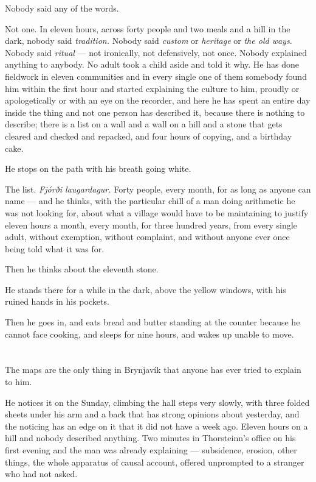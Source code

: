 \documentclass[11pt,oneside]{book}
\begin{document}
Nobody said any of the words.

Not one. In eleven hours, across forty people and two meals and a hill
in the dark, nobody said \emph{tradition.} Nobody said \emph{custom} or
\emph{heritage} or \emph{the old ways.} Nobody said \emph{ritual} ---
not ironically, not defensively, not once. Nobody explained anything to
anybody. No adult took a child aside and told it why. He has done
fieldwork in eleven communities and in every single one of them somebody
found him within the first hour and started explaining the culture to
him, proudly or apologetically or with an eye on the recorder, and here
he has spent an entire day inside the thing and not one person has
described it, because there is nothing to describe; there is a list on
a wall and a wall on a hill and a stone that gets cleared and checked
and repacked, and four hours of copying, and a birthday cake.

He stops on the path with his breath going white.

The list. \emph{Fjórði laugardagur.} Forty people, every month, for as
long as anyone can name --- and he thinks, with the particular chill of
a man doing arithmetic he was not looking for, about what a village
would have to be maintaining to justify eleven hours a month, every
month, for three hundred years, from every single adult, without
exemption, without complaint, and without anyone ever once being told
what it was for.

Then he thinks about the eleventh stone.

He stands there for a while in the dark, above the yellow windows, with
his ruined hands in his pockets.

Then he goes in, and eats bread and butter standing at the counter
because he cannot face cooking, and sleeps for nine hours, and wakes up
unable to move.

\chapter{}

The maps are the only thing in Brynjavík that anyone has ever tried to
explain to him.

He notices it on the Sunday, climbing the hall steps very slowly, with
three folded sheets under his arm and a back that has strong opinions
about yesterday, and the noticing has an edge on it that it did not have
a week ago. Eleven hours on a hill and nobody described
anything. Two minutes in Thorsteinn's office on his first evening and
the man was already explaining --- subsidence, erosion, other things,
the whole apparatus of causal account, offered unprompted to a stranger
who had not asked.
\end{document}
